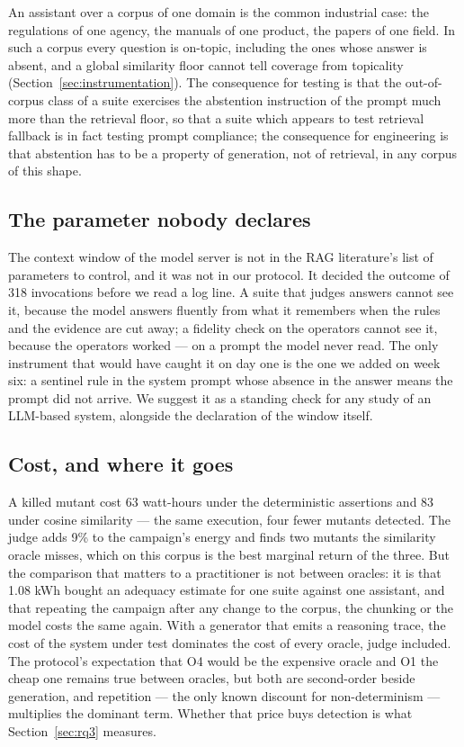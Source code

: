 \documentclass[a4paper,fleqn]{cas-dc}
\begin{document}
An assistant over a corpus of one domain is the common industrial case: the
regulations of one agency, the manuals of one product, the papers of one
field. In such a corpus every question is on-topic, including the ones whose
answer is absent, and a global similarity floor cannot tell coverage from
topicality (Section~\ref{sec:instrumentation}). The consequence for testing is
that the out-of-corpus class of a suite exercises the abstention instruction
of the prompt much more than the retrieval floor, so that a suite which
appears to test retrieval fallback is in fact testing prompt compliance; the
consequence for engineering is that abstention has to be a property of
generation, not of retrieval, in any corpus of this shape.

\subsection{The parameter nobody declares}

The context window of the model server is not in the RAG literature's list of
parameters to control, and it was not in our protocol. It decided the outcome
of 318 invocations before we read a log line. A suite that judges answers
cannot see it, because the model answers fluently from what it remembers when
the rules and the evidence are cut away; a fidelity check on the operators
cannot see it, because the operators worked --- on a prompt the model never
read. The only instrument that would have caught it on day one is the one we
added on week six: a sentinel rule in the system prompt whose absence in the
answer means the prompt did not arrive. We suggest it as a standing check for
any study of an LLM-based system, alongside the declaration of the window
itself.

\subsection{Cost, and where it goes}

A killed mutant cost 63 watt-hours under the deterministic assertions and 83
under cosine similarity --- the same execution, four fewer mutants detected.
The judge adds 9\% to the campaign's energy and finds two mutants the
similarity oracle misses, which on this corpus is the best marginal return of
the three. But the comparison that matters to a practitioner is not between
oracles: it is that 1.08 kWh bought an adequacy estimate for one suite against
one assistant, and that repeating the campaign after any change to the corpus,
the chunking or the model costs the same again. With a
generator that emits a reasoning trace, the cost of the system under test
dominates the cost of every oracle, judge included. The protocol's expectation
that O4 would be the expensive oracle and O1 the cheap one remains true
between oracles, but both are second-order beside generation, and repetition
--- the only known discount for non-determinism --- multiplies the dominant
term. Whether that price buys detection is what Section~\ref{sec:rq3}
measures.
\end{document}
